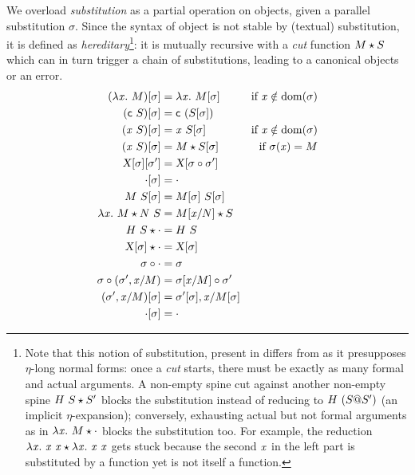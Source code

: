 \documentclass[9pt]{sigplanconf}
\begin{document}
We overload \emph{substitution} as a partial operation on objects,
given a parallel substitution $\sigma$. Since the syntax of object is
not stable by (textual) substitution, it is defined as
\emph{hereditary}\footnote{ Note that this notion of substitution,
  present in \cite{pfenning2007term} differs from
  \cite{hl07mechanizing} as it presupposes $\eta$-long normal forms:
  once a \emph{cut} starts, there must be exactly as many formal and
  actual arguments. A non-empty spine cut against another non-empty
  spine ${{H}\  S}\star{S'}$ blocks the substitution instead of
  reducing to ${H}\  {({S}@{S}')}$ (an implicit
  $\eta$-expansion); conversely, exhausting actual but not formal
  arguments as in ${\lambda{\ensuremath{\text{\textit{x}}}}.\  M}\star{\cdot}$ blocks the substitution
  too. For example, the reduction ${\lambda{\ensuremath{\text{\textit{x}}}}.\  {\text{\textit{x}}}\ {\text{\textit{x}}}}\star{\lambda{\ensuremath{\text{\textit{x}}}}.\ {\ensuremath{\text{\textit{x}}}}\ {\ensuremath{\text{\textit{x}}}}}$ gets stuck because the
  second $\text{\textit{x}}$ in the left part is substituted by a function yet is
  not itself a function. }: it is mutually recursive with a \emph{cut}
function ${M}\star{S}$ which can in turn trigger a chain of
substitutions, leading to a canonical objects or an error.
\begin{align*}
  {(\lambda{\ensuremath{\text{\textit{x}}}}.\ M)}[{\sigma}] &= \lambda{\ensuremath{\text{\textit{x}}}}.\  {{M}[{\sigma}]} &
  \text{if $\text{\textit{x}}\notin \operatorname{dom}{\!(\sigma)}$}
  \\
  {({\text{\textsf{c}}}\  S)}[{\sigma}] &= {\text{\textsf{c}}}\  {({S}[{\sigma}])}
  \\
  {({\text{\textit{x}}}\  S)}[{\sigma}] &=
  {\text{\textit{x}}}\  {{S}[{\sigma}]} &
  \text{if $\text{\textit{x}}\notin \operatorname{dom}{\!(\sigma)}$}
  \\
  {({\text{\textit{x}}}\  S)}[{\sigma}] &=
  {M}\star{{S}[{\sigma}]} &
  \text{if $\sigma(\text{\textit{x}}) = M$}
  \\
  {{\text{\textsl{X}}}[{\sigma}]}[{\sigma'}] &=
  {\text{\textsl{X}}}[{{\sigma}\circ{\sigma'}}]
  \\
  {\cdot}[{\sigma}] &=
  \cdot \\
  {{M}\ {S}}[{\sigma}] &=
  {{M}[{\sigma}]}\ {{S}[{\sigma}]}
  \\
  {\lambda{\ensuremath{\text{\textit{x}}}}.\  M}\star{{N}\ {S}} &=
  {{M}[{{\text{\textit{x}}}/{N}}]}\star{S}
  \\
  {{H}\  S}\star{\cdot} &=
  {H}\  S
  \\
  {{\text{\textsl{X}}}[{\sigma}]}\star{\cdot} &= {\text{\textsl{X}}}[{\sigma}]
  \\
  {\sigma}\circ{\cdot} &=
  \sigma
  \\
  {\sigma}\circ{({\sigma'},{{\ensuremath{\text{\textit{x}}}}/{M}})} &=
  {{\sigma}[{{\text{\textit{x}}}/{M}}]}\circ{\sigma}'
  \\
  {({\sigma'},{{\text{\textit{x}}}/{M}})}[{\sigma}] &=
  {{\sigma'}[{\sigma}]},{{\text{\textit{x}}}/{{M}[{\sigma}]}}
  \\
  {\cdot}[{\sigma}] &= \cdot
\end{align*}
\end{document}
